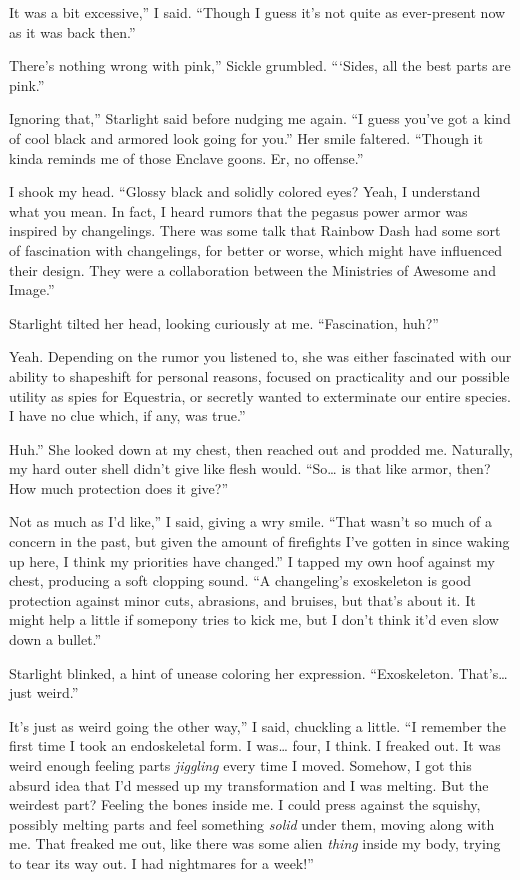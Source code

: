 \leavevmode{}It was a bit excessive,” I said. “Though I guess it’s not quite as ever-present now as it was back then.”

\leavevmode{}There’s nothing wrong with pink,” Sickle grumbled. “‘Sides, all the best parts are pink.”

\leavevmode{}Ignoring that,” Starlight said before nudging me again. “I guess you’ve got a kind of cool black and armored look going for you.” Her smile faltered. “Though it kinda reminds me of those Enclave goons. Er, no offense.”

I shook my head. “Glossy black and solidly colored eyes? Yeah, I understand what you mean. In fact, I heard rumors that the pegasus power armor was inspired by changelings. There was some talk that Rainbow Dash had some sort of fascination with changelings, for better or worse, which might have influenced their design. They were a collaboration between the Ministries of Awesome and Image.”

Starlight tilted her head, looking curiously at me. “Fascination, huh?”

\leavevmode{}Yeah. Depending on the rumor you listened to, she was either fascinated with our ability to shapeshift for personal reasons, focused on practicality and our possible utility as spies for Equestria, or secretly wanted to exterminate our entire species. I have no clue which, if any, was true.”

\leavevmode{}Huh.” She looked down at my chest, then reached out and prodded me. Naturally, my hard outer shell didn’t give like flesh would. “So… is that like armor, then? How much protection does it give?”

\leavevmode{}Not as much as I’d like,” I said, giving a wry smile. “That wasn’t so much of a concern in the past, but given the amount of firefights I’ve gotten in since waking up here, I think my priorities have changed.” I tapped my own hoof against my chest, producing a soft clopping sound. “A changeling’s exoskeleton is good protection against minor cuts, abrasions, and bruises, but that’s about it. It might help a little if somepony tries to kick me, but I don’t think it’d even slow down a bullet.”

Starlight blinked, a hint of unease coloring her expression. “Exoskeleton. That’s… just weird.”

\leavevmode{}It’s just as weird going the other way,” I said, chuckling a little. “I remember the first time I took an endoskeletal form. I was… four, I think. I freaked out. It was weird enough feeling parts \textit{jiggling} every time I moved. Somehow, I got this absurd idea that I’d messed up my transformation and I was melting. But the weirdest part? Feeling the bones inside me. I could press against the squishy, possibly melting parts and feel something \textit{solid} under them, moving along with me. That freaked me out, like there was some alien \textit{thing} inside my body, trying to tear its way out. I had nightmares for a week!”

